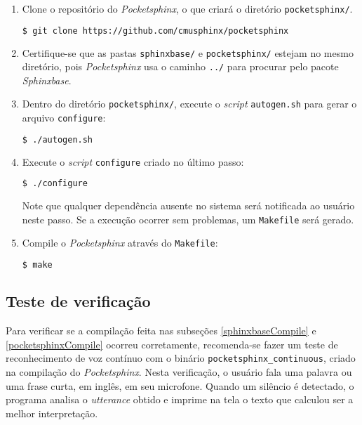 \begin{enumerate}
\item Clone o repositório do \textit{Pocketsphinx}, o que criará o diretório \texttt{pocketsphinx/}.

\begin{lstlisting}[language=Bash]
$ git clone https://github.com/cmusphinx/pocketsphinx
\end{lstlisting}

\item Certifique-se que as pastas \texttt{sphinxbase/} e \texttt{pocketsphinx/} estejam no mesmo diretório, pois \textit{Pocketsphinx} usa o caminho \texttt{../} para procurar pelo pacote \textit{Sphinxbase}.

\item Dentro do diretório \texttt{pocketsphinx/}, execute o \textit{script} \texttt{autogen.sh} para gerar o arquivo \texttt{configure}:

\begin{lstlisting}[language=Bash]
$ ./autogen.sh
\end{lstlisting}

\item Execute o \textit{script} \texttt{configure} criado no último passo:

\begin{lstlisting}[language=Bash]
$ ./configure
\end{lstlisting}

Note que qualquer dependência ausente no sistema será notificada ao usuário neste passo. Se a execução ocorrer sem problemas, um \texttt{Makefile} será gerado.

\item Compile o \textit{Pocketsphinx} através do \texttt{Makefile}:

\begin{lstlisting}[language=Bash]
$ make
\end{lstlisting}

\end{enumerate}


\subsection{Teste de verificação}

Para verificar se a compilação feita nas subseções \ref{sphinxbaseCompile} e \ref{pocketsphinxCompile} ocorreu corretamente, recomenda-se fazer um teste de reconhecimento de voz contínuo com o binário \texttt{pocketsphinx\_continuous}, criado na compilação do \textit{Pocketsphinx}. Nesta verificação, o usuário fala uma palavra ou uma frase curta, em inglês, em seu microfone. Quando um silêncio é detectado, o programa analisa o \textit{utterance} obtido e imprime na tela o texto que calculou ser a melhor interpretação.

